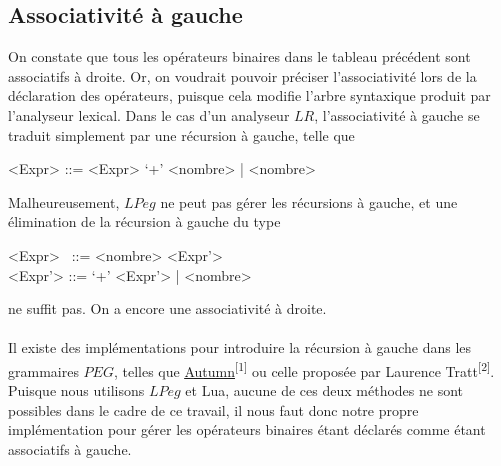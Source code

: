 \documentclass{article}
\begin{document}
\subsection{Associativité à gauche}
On constate que tous les opérateurs binaires dans le tableau précédent sont associatifs à droite. Or, on voudrait pouvoir préciser l'associativité lors de la déclaration des opérateurs, puisque cela modifie l'arbre syntaxique produit par l'analyseur lexical. Dans le cas d'un analyseur $LR$, l'associativité à gauche se traduit simplement par une récursion à gauche, telle que
\begin{grammar}
	<Expr> ::= <Expr> `+' <nombre> | <nombre>
\end{grammar}
Malheureusement, $LPeg$ ne peut pas gérer les récursions à gauche, et une élimination de la récursion à gauche du type
\begin{grammar}
	<Expr> \ ::= <nombre> <Expr'> \\
	<Expr'> ::= `+' <Expr'> | <nombre>
\end{grammar}
ne suffit pas. On a encore une associativité à droite. \\ \\
Il existe des implémentations pour introduire la récursion à gauche dans les grammaires $PEG$, telles que \underline{\href{https://github.com/norswap/whimsy/blob/master/doc/autumn/README.md}{Autumn}}\textsuperscript{[1]} ou celle proposée par Laurence Tratt\textsuperscript{[2]}. Puisque nous utilisons $LPeg$ et Lua, aucune de ces deux méthodes ne sont possibles dans le cadre de ce travail, il nous faut donc notre propre implémentation pour gérer les opérateurs binaires étant déclarés comme étant associatifs à gauche.
\end{document}
